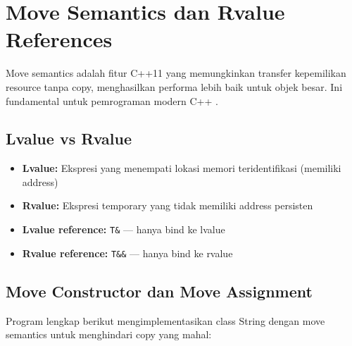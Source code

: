 \documentclass[../main.tex]{subfiles}
\begin{document}
\section{Move Semantics dan Rvalue References}
Move semantics adalah fitur C++11 yang memungkinkan transfer kepemilikan resource tanpa copy, menghasilkan performa lebih baik untuk objek besar. Ini fundamental untuk pemrograman modern C++ \parencite{cpp-reference}.

\subsection{Lvalue vs Rvalue}
\begin{itemize}
  \item \textbf{Lvalue:} Ekspresi yang menempati lokasi memori teridentifikasi (memiliki address)
  \item \textbf{Rvalue:} Ekspresi temporary yang tidak memiliki address persisten
  \item \textbf{Lvalue reference:} \texttt{T\&} --- hanya bind ke lvalue
  \item \textbf{Rvalue reference:} \texttt{T\&\&} --- hanya bind ke rvalue
\end{itemize}

\subsection{Move Constructor dan Move Assignment}

Program lengkap berikut mengimplementasikan class String dengan move semantics untuk menghindari copy yang mahal:
\end{document}

